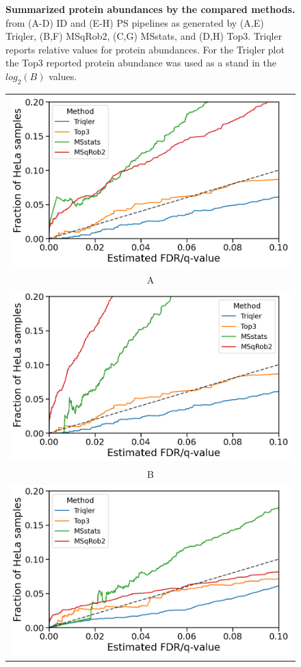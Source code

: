 \documentclass[11pt]{article}
\begin{document}
\begin{figure}[hbt]
\begin{tabular}{   >{\centering\arraybackslash} m{3cm} V V}
    \end{tabular}
    \caption{{\bf Summarized protein abundances by the compared methods.} from (A-D) ID and (E-H) PS pipelines as generated by 
    (A,E) Triqler, (B,F) MSqRob2, (C,G) MSstats, and (D,H) Top3.   Triqler reports relative values for protein abundances. For the Triqler plot the Top3 reported protein abundance was used as a stand in the $log_2(B)$ values. \label{fig:fc_scatter_supplement}}
\end{figure}



\begin{figure}[hbt]
    \centering
    \centering
    \begin{tabular}{c} 
        \includegraphics[width=0.5\linewidth]{../../result/report_plots_pipeline/calibration_ID_0.png} \\
        A \\ 
        \includegraphics[width=0.5\linewidth]{../../result/report_plots_pipeline/calibration_ID_0.51.png} \\
        B \\
        \includegraphics[width=0.5\linewidth]{../../result/report_plots_pipeline/calibration_PS_0.png} \\

\end{tabular}
\end{figure}
\end{document}
